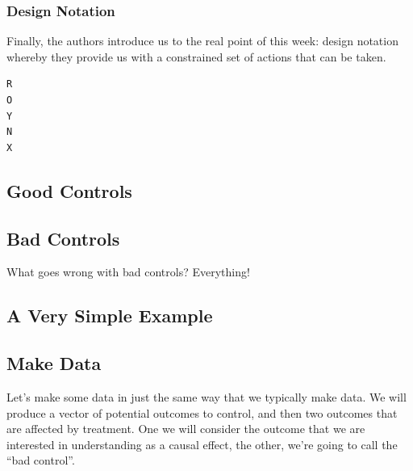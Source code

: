 \documentclass[
]{article}
\begin{document}
\hypertarget{design-notation-1}{%
\subsubsection{Design Notation}\label{design-notation-1}}

Finally, the authors introduce us to the real point of this week: design notation whereby they provide us with a constrained set of actions that can be taken.

\begin{verbatim}
R
O 
Y 
N 
X 
\end{verbatim}

\hypertarget{good-controls}{%
\subsection{Good Controls}\label{good-controls}}

\hypertarget{bad-controls}{%
\subsection{Bad Controls}\label{bad-controls}}

What goes wrong with bad controls? Everything!

\hypertarget{a-very-simple-example}{%
\subsection{A Very Simple Example}\label{a-very-simple-example}}

\hypertarget{make-data-1}{%
\subsection{Make Data}\label{make-data-1}}

Let's make some data in just the same way that we typically make data. We will produce a vector of potential outcomes to control, and then two outcomes that are affected by treatment. One we will consider the outcome that we are interested in understanding as a causal effect, the other, we're going to call the ``bad control''.
\end{document}
